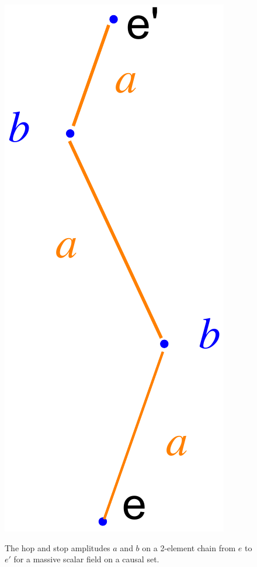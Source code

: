 \begin{figure}[ht]
  \centering \resizebox{0.75in}{!} {\includegraphics[width=\textwidth]{Hopstop}} 
  \caption{The hop and stop amplitudes $a$ and $b$ on a 2-element chain from $e$ to $e'$ for a massive scalar field on a causal set.}
\label{hopstop.fig} 
\end{figure}


